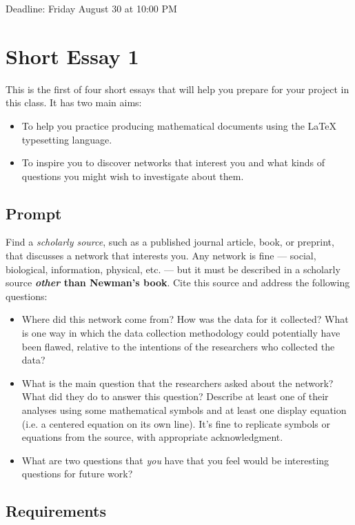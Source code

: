 \documentclass[a4paper, 12pt]{article}
\begin{document}
\noindent
Deadline: Friday August 30 at 10:00 PM

\section*{Short Essay 1}

This is the first of four short essays that will help you prepare for your project in this class. 
It has two main aims: 
\begin{itemize}
    \item To help you practice producing mathematical documents using the \LaTeX{} typesetting language. 
    \item To inspire you to discover networks that interest you and what kinds of questions you might wish to investigate about them. 
\end{itemize}

\subsection*{Prompt}

Find a \emph{scholarly source}, such as a published journal article, book, or preprint, that discusses a network that interests you. 
Any network is fine --- social, biological, information, physical, etc. --- but it must be described in a scholarly source \textbf{\emph{other} than Newman's book}. 
Cite this source and address the following questions: 
\begin{itemize}
    \item Where did this network come from? How was the data for it collected? What is one way in which the data collection methodology could potentially have been flawed, relative to the intentions of the researchers who collected the data? 
    \item What is the main question that the researchers asked about the network? What did they do to answer this question? Describe at least one of their analyses using some mathematical symbols and at least one display equation (i.e. a centered equation on its own line). 
    It's fine to replicate symbols or equations from the source, with appropriate acknowledgment. 
    \item What are two questions that \emph{you} have that you feel would be interesting questions for future work? 
\end{itemize}

\subsection*{Requirements}
\end{document}
